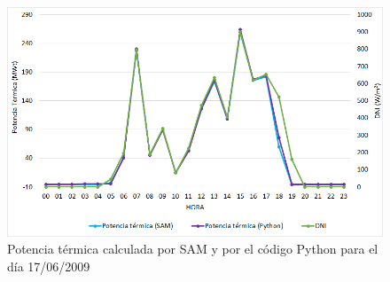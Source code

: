 \begin{figure}
\includegraphics[width=0.9\linewidth]{images/176potencia.png}
\caption{Potencia térmica calculada por SAM y por el código Python para el día 17/06/2009} 
\label{fig:176potencia}
\end{figure}


